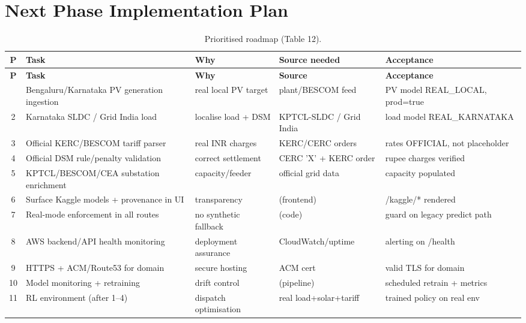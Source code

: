\documentclass[11pt,a4paper]{article}
\begin{document}
\section{Next Phase Implementation Plan}
\begin{footnotesize}
\begin{longtable}{@{}c p{3.4cm}p{3.0cm}p{2.6cm}p{2.4cm}@{}}
\caption{Prioritised roadmap (Table 12).}\label{tab:roadmap}\\
\toprule
\textbf{P} & \textbf{Task} & \textbf{Why} & \textbf{Source needed} & \textbf{Acceptance}\\
\midrule\endfirsthead
\toprule \textbf{P} & \textbf{Task} & \textbf{Why} & \textbf{Source} & \textbf{Acceptance}\\ \midrule\endhead
\bottomrule\endfoot
1 & Bengaluru/Karnataka PV generation ingestion & real local PV target & plant/BESCOM feed & PV model REAL\_LOCAL, prod=true\\
2 & Karnataka SLDC / Grid India load & localise load + DSM & KPTCL-SLDC / Grid India & load model REAL\_KARNATAKA\\
3 & Official KERC/BESCOM tariff parser & real INR charges & KERC/CERC orders & rates OFFICIAL, not placeholder\\
4 & Official DSM rule/penalty validation & correct settlement & CERC 'X' + KERC order & rupee charges verified\\
5 & KPTCL/BESCOM/CEA substation enrichment & capacity/feeder & official grid data & capacity populated\\
6 & Surface Kaggle models + provenance in UI & transparency & (frontend) & /kaggle/* rendered\\
7 & Real-mode enforcement in all routes & no synthetic fallback & (code) & guard on legacy predict path\\
8 & AWS backend/API health monitoring & deployment assurance & CloudWatch/uptime & alerting on /health\\
9 & HTTPS + ACM/Route53 for domain & secure hosting & ACM cert & valid TLS for domain\\
10 & Model monitoring + retraining & drift control & (pipeline) & scheduled retrain + metrics\\
11 & RL environment (after 1--4) & dispatch optimisation & real load+solar+tariff & trained policy on real env\\
\end{longtable}
\end{footnotesize}
\end{document}
